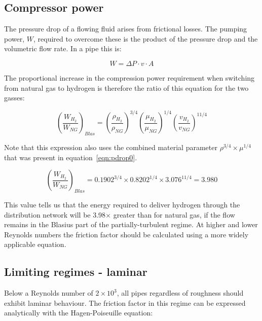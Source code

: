 \documentclass[5p]{elsarticle} %
\begin{document}
\subsection{Compressor power}
\label{sec:comppower}

The pressure drop of a flowing fluid arises from frictional losses. The pumping power, $W$, required to overcome these
is the product of the pressure drop and the volumetric flow rate. 
In a pipe this is:

\begin{equation}
\label{eqn:power}
 W = \Delta P \cdot v \cdot A 
\end{equation}

The proportional increase in the compression power requirement when switching from natural gas to hydrogen is therefore the ratio of this equation for the two gasses:

\begin{equation}
\label{eqn:powerratio}
    \left(\frac{W_{H_2}}{W_{NG}}\right)_{Blas} =
    \left(\frac{\rho_{H_2}}{\rho_{NG}}\right)^{3/4} 
    \left(\frac{\mu_{H_2}}{\mu_{NG}}\right)^{1/4} 
    \left(\frac{v_{H_2}}{v_{NG}}\right)^{11/4} 
\end{equation}

Note that this expression also uses the combined material parameter $\rho^{3/4} \times \mu^{1/4}$ that was present in equation~\ref{eqn:pdrop0}.

\begin{equation}
\label{eqn:powerratiovalue}
    \left(\frac{W_{H_2}}{W_{NG}}\right)_{Blas} = 
    0.1902^{3/4} \times 0.8202^{1/4} \times 3.076^{11/4} = \mathbf{3.980}
\end{equation}

This value tells us that the energy required to deliver hydrogen through the distribution network will be 3.98$\times$ greater than for natural gas, if the flow remains in the Blasius part of the partially-turbulent regime.
At higher and lower  Reynolds numbers the friction factor should be calculated using a more widely applicable equation.

\subsection{Limiting regimes - laminar}
\label{sec:laminarturbulent}

Below a Reynolds number of $2\times10^3$, all pipes regardless of roughness should exhibit laminar behaviour. 
The friction factor in this regime can be expressed analytically with the Hagen-Poiseuille equation:
\end{document}
